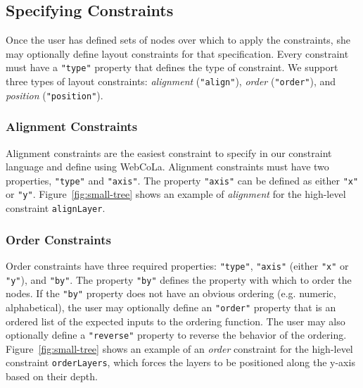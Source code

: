 \subsection{Specifying Constraints}
Once the user has defined sets of nodes over which to apply the constraints, she may optionally define layout constraints for that specification. Every constraint must have a \texttt{"type"} property that defines the type of constraint. We support three types of layout constraints: \emph{alignment} (\texttt{"align"}), \emph{order} (\texttt{"order"}), and \emph{position} (\texttt{"position"}).

\subsubsection{Alignment Constraints}
Alignment constraints are the easiest constraint to specify in our constraint language and define using WebCoLa. Alignment constraints must have two properties, \texttt{"type"} and \texttt{"axis"}. The property \texttt{"axis"} can be defined as either \texttt{"x"} or \texttt{"y"}. Figure~\ref{fig:small-tree} shows an example of \emph{alignment} for the high-level constraint \texttt{alignLayer}.

\subsubsection{Order Constraints}
Order constraints have three required properties: \texttt{"type"}, \texttt{"axis"} (either \texttt{"x"} or \texttt{"y"}), and \texttt{"by"}. The property \texttt{"by"} defines the property with which to order the nodes. If the \texttt{"by"} property does not have an obvious ordering (e.g. numeric, alphabetical), the user may optionally define an \texttt{"order"} property that is an ordered list of the expected inputs to the ordering function. The user may also optionally define a \texttt{"reverse"} property to reverse the behavior of the ordering. Figure~\ref{fig:small-tree} shows an example of an \emph{order} constraint for the high-level constraint \texttt{orderLayers}, which forces the layers to be positioned along the y-axis based on their depth.

